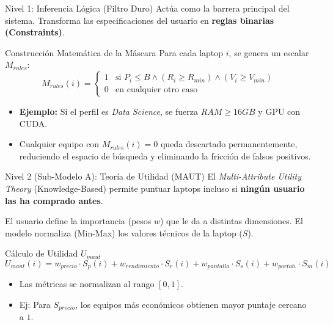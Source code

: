 \documentclass[aspectratio=169]{beamer}
\begin{document}
\begin{frame}{Nivel 1: Inferencia Lógica (Filtro Duro)}
    Actúa como la barrera principal del sistema. Transforma las especificaciones del usuario en \textbf{reglas binarias (Constraints)}.
    
    \vspace{0.3cm}
    \begin{block}{Construcción Matemática de la Máscara}
        Para cada laptop $i$, se genera un escalar $M_{rules}$:
        \begin{equation}
            M_{rules}(i) = \begin{cases} 
            1 & \text{si } P_i \le B \land (R_i \ge R_{min}) \land (V_i \ge V_{min}) \\
            0 & \text{en cualquier otro caso}
            \end{cases}
        \end{equation}
    \end{block}

    \vspace{0.3cm}
    \begin{itemize}
        \item \textbf{Ejemplo:} Si el perfil es \textit{Data Science}, se fuerza $RAM \ge 16GB$ y GPU con CUDA.
        \item Cualquier equipo con $M_{rules}(i) = 0$ queda descartado permanentemente, reduciendo el espacio de búsqueda y eliminando la fricción de falsos positivos.
    \end{itemize}
\end{frame}

\begin{frame}{Nivel 2 (Sub-Modelo A): Teoría de Utilidad (MAUT)}
    El \textit{Multi-Attribute Utility Theory} (Knowledge-Based) permite puntuar laptops incluso si \textbf{ningún usuario las ha comprado antes}.
    
    \vspace{0.2cm}
    El usuario define la importancia (pesos $w$) que le da a distintas dimensiones. El modelo normaliza (Min-Max) los valores técnicos de la laptop ($S$).
    
    \begin{block}{Cálculo de Utilidad $U_{maut}$}
        \begin{equation}
            U_{maut}(i) = w_{precio} \cdot S_{p}(i) + w_{rendimiento} \cdot S_{r}(i) + w_{pantalla} \cdot S_{s}(i) + w_{portab.} \cdot S_{m}(i)
        \end{equation}
    \end{block}
    
    \begin{itemize}
        \item Las métricas se normalizan al rango $[0, 1]$.
        \item Ej: Para $S_{precio}$, los equipos más económicos obtienen mayor puntaje cercano a $1$.
    \end{itemize}
\end{frame}
\end{document}

